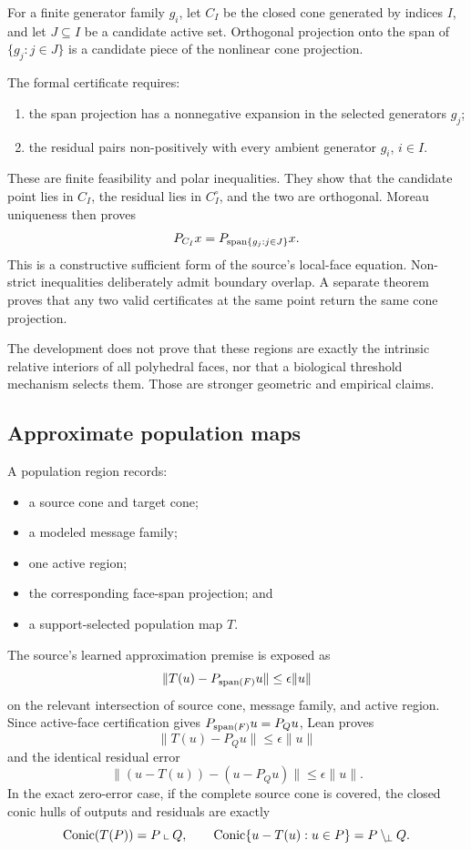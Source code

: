 \documentclass[11pt,a4paper]{article}
\begin{document}
For a finite generator family \(g_i\), let \(C_I\) be the closed cone
generated by indices \(I\), and let \(J\subseteq I\) be a candidate active
set. Orthogonal projection onto the span of \(\{g_j:j\in J\}\) is a candidate
piece of the nonlinear cone projection.

The formal certificate requires:

\begin{enumerate}
  \item the span projection has a nonnegative expansion in the selected
    generators \(g_j\);
  \item the residual pairs non-positively with every ambient generator
    \(g_i\), \(i\in I\).
\end{enumerate}

These are finite feasibility and polar inequalities. They show that the
candidate point lies in \(C_I\), the residual lies in \(C_I^\circ\), and the
two are orthogonal. Moreau uniqueness then proves
\[
  P_{C_I}x=P_{\operatorname{span}\{g_j:j\in J\}}x.
\]
This is a constructive sufficient form of the source's local-face equation.
Non-strict inequalities deliberately admit boundary overlap. A separate
theorem proves that any two valid certificates at the same point return the
same cone projection.

The development does not prove that these regions are exactly the intrinsic
relative interiors of all polyhedral faces, nor that a biological threshold
mechanism selects them. Those are stronger geometric and empirical claims.

\subsection{Approximate population maps}

A population region records:

\begin{itemize}
  \item a source cone and target cone;
  \item a modeled message family;
  \item one active region;
  \item the corresponding face-span projection; and
  \item a support-selected population map \(T\).
\end{itemize}

The source's learned approximation premise is exposed as
\[
  \|T(u)-P_{\operatorname{span}(F)}u\|\leq\epsilon\|u\|
\]
on the relevant intersection of source cone, message family, and active
region. Since active-face certification gives
\(P_{\operatorname{span}(F)}u=P_Qu\), Lean proves
\[
  \|T(u)-P_Qu\|\leq\epsilon\|u\|
\]
and the identical residual error
\[
  \|(u-T(u))-(u-P_Qu)\|\leq\epsilon\|u\|.
\]
In the exact zero-error case, if the complete source cone is covered, the
closed conic hulls of outputs and residuals are exactly
\[
  \operatorname{Conic}(T(P))=P\mathbin{\llcorner} Q,
  \qquad
  \operatorname{Conic}\{u-T(u):u\in P\}=P\mathbin{\backslash_{\!\perp}} Q.
\]
\end{document}
